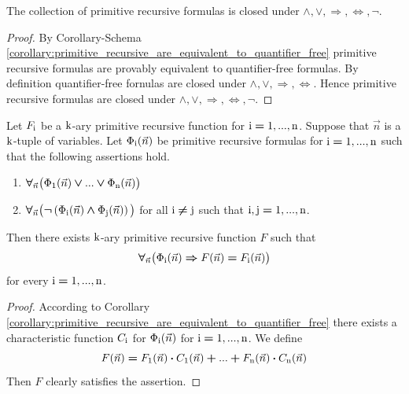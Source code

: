 \documentclass[10pt]{amsart}
\newcommand{\mforall}{\boldsymbol{\forall}}
\newcommand{\mra}{\boldsymbol{\Rightarrow}}
\newcommand{\mequiv}{\boldsymbol{\Leftrightarrow}}
\newcommand{\mand}{\boldsymbol{\wedge}}
\newcommand{\mor}{\boldsymbol{\vee}}
\newcommand{\mneg}{\boldsymbol{\neg}}
\newcommand{\meq}{\boldsymbol{=}}
\newcommand{\mneq}{\boldsymbol{\neq}}
\newcommand{\mplus}{\boldsymbol{+}}
\newcommand{\mdot}{\boldsymbol{\cdot}}
\begin{document}
\begin{corollary}\label{corollary:primitive_recursive_formulas_are_closed_under_connectives}
	The collection of primitive recursive formulas is closed under $\mand, \mor, \mra, \mequiv, \mneg$.
\end{corollary}
\begin{proof}
	By Corollary-Schema \ref{corollary:primitive_recursive_are_equivalent_to_quantifier_free} primitive recursive formulas are provably equivalent to quantifier-free formulas. By definition quantifier-free fornulas are closed under $\mand, \mor, \mra, \mequiv$. Hence primitive recursive formulas are closed under $\mand, \mor, \mra, \mequiv, \mneg$.
\end{proof}

\begin{corollary}\label{corollary:definition_by_primitive_recursive_cases}
	Let $F_{\rm{i}}$ be a $\rm{k}$-ary primitive recursive function for $\rm{i}\meq\rm{1},...,\rm{n}$. Suppose that $\vec{n}$ is a $\rm{k}$-tuple of variables. Let $\Phi_{\rm{i}}(\vec{n})$ be primitive recursive formulas for $\rm{i} \meq \rm{1},...,\rm{n}$ such that the following assertions hold.
	\begin{enumerate}[label=\emph{\textbf{(\arabic*)}}, leftmargin=3.0em]
		\item $\mforall_{\vec{n}}\big(\Phi_{\rm{1}}(\vec{n}) \mor ... \mor \Phi_{\rm{n}}(\vec{n})\big)$
		\item $\mforall_{\vec{n}}\big(\mneg \left(\Phi_{\rm{i}}(\vec{n})\mand \Phi_{\rm{j}}(\vec{n})\right)\big)$ for all $\rm{i} \mneq \rm{j}$ such that $\rm{i},\rm{j}\meq\rm{1},...,\rm{n}$.
	\end{enumerate}
	Then there exists $\rm{k}$-ary primitive recursive function $F$ such that
	$$\mforall_{\vec{n}}\big(\Phi_{\rm{i}}(\vec{n}) \mra F(\vec{n}) \meq F_{\rm{i}}(\vec{n})\big)$$
	for every $\rm{i}\meq\rm{1},...,\rm{n}$.
\end{corollary}
\begin{proof}
	According to Corollary \ref{corollary:primitive_recursive_are_equivalent_to_quantifier_free} there exists a characteristic function $C_{\rm{i}}$ for $\Phi_{\rm{i}}(\vec{n})$ for $\rm{i}\meq\rm{1},...,\rm{n}$. We define
	$$F(\vec{n}) \meq F_{\rm{1}}(\vec{n}) \mdot C_{\rm{1}}(\vec{n}) \mplus ... \mplus F_{\rm{n}}(\vec{n}) \mdot C_{\rm{n}}(\vec{n})$$
	Then $F$ clearly satisfies the assertion.
\end{proof}
\end{document}
